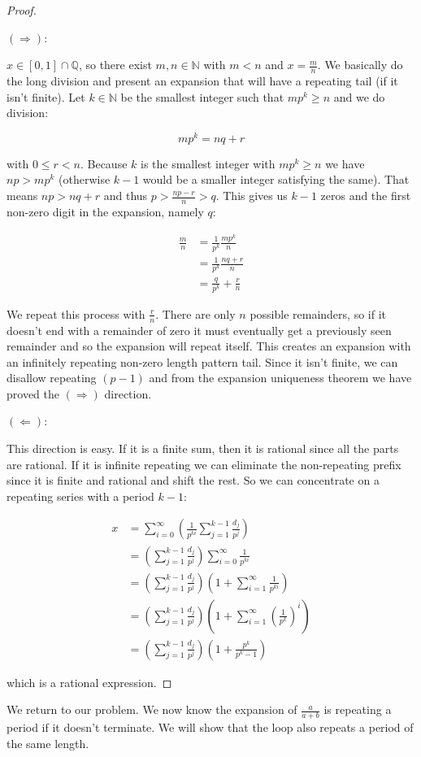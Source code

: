 \begin{proof} \

$(\Rightarrow)$:

$x \in [0, 1] \cap \mathbb{Q}$, so there exist $m, n \in \mathbb{N}$ with $m < n$ and $x = \frac{m}{n}$. We basically do the long division and present an expansion that will have a repeating tail (if it isn't finite). Let $k \in \mathbb{N}$ be the smallest integer such that $m p^k \geq n$ and we do division:

$$
m p^k = n q + r
$$

with $0 \leq r < n$. Because $k$ is the smallest integer with $m p^k \geq n$ we have $n p > m p^k$ (otherwise $k-1$ would be a smaller integer satisfying the same). That means $n p > n q + r$ and thus $p > \frac{n p - r}{n} > q$. This gives us $k-1$ zeros and the first non-zero digit in the expansion, namely $q$:

\begin{align*}
\frac{m}{n} &= \frac{1}{p^k} \frac{m p^k}{n} \\
            &= \frac{1}{p^k} \frac{ n q + r}{n} \\
            &= \frac{q}{p^k} + \frac{r}{n}
\end{align*}

We repeat this process with $\frac{r}{n}$. There are only $n$ possible remainders, so if it doesn't end with a remainder of zero it must eventually get a previously seen remainder and so the expansion will repeat itself. This creates an expansion with an infinitely repeating non-zero length pattern tail. Since it isn't finite, we can disallow repeating $(p-1)$ and from the expansion uniqueness theorem we have proved the $(\Rightarrow)$ direction.

$(\Leftarrow)$:

This direction is easy. If it is a finite sum, then it is rational since all the parts are rational. If it is infinite repeating we can eliminate the non-repeating prefix since it is finite and rational and shift the rest. So we can concentrate on a repeating series with a period $k-1$:

\begin{align*}
x &= \sum_{i = 0}^\infty (\frac{1}{p^{k i}} \sum_{j = 1}^{k-1} \frac{d_j}{p^j}) \\
  &= (\sum_{j = 1}^{k-1} \frac{d_j}{p^j}) \sum_{i = 0}^\infty \frac{1}{p^{k i}} \\
  &= (\sum_{j = 1}^{k-1} \frac{d_j}{p^j}) (1 + \sum_{i = 1}^\infty \frac{1}{p^{k i}}) \\
  &= (\sum_{j = 1}^{k-1} \frac{d_j}{p^j}) (1 + \sum_{i = 1}^\infty (\frac{1}{p^{k}})^i) \\
  &= (\sum_{j = 1}^{k-1} \frac{d_j}{p^j}) (1 + \frac{p^k}{p^k -1})
\end{align*}

which is a rational expression.
\end{proof}

We return to our problem. We now know the expansion of $\frac{a}{a+b}$ is repeating a period if it doesn't terminate. We will show that the loop also repeats a period of the same length.

